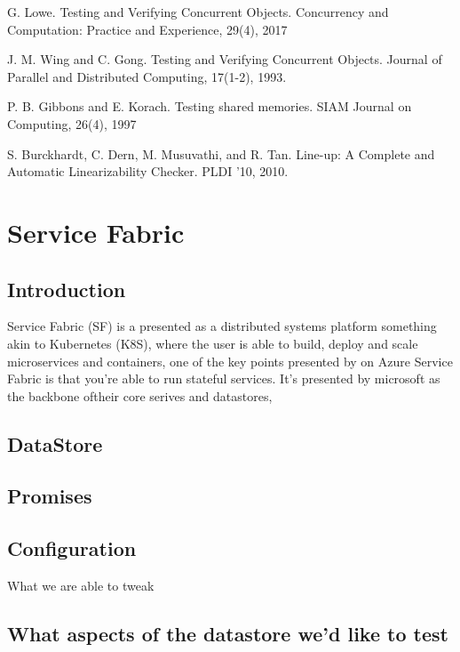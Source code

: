 \documentclass[
  a4paper,  %
  twoside,  %
  bibliography=totoc,
  headsepline,
  cleardoublepage=empty,
  parskip=half,
  draft=false
]{scrbook}
\begin{document}
G. Lowe. Testing and Verifying Concurrent Objects.
Concurrency and Computation: Practice and
Experience, 29(4), 2017

J. M. Wing and C. Gong. Testing and Verifying
Concurrent Objects. Journal of Parallel and
Distributed Computing, 17(1-2), 1993.

P. B. Gibbons and E. Korach. Testing shared
memories. SIAM Journal on Computing, 26(4), 1997

S. Burckhardt, C. Dern, M. Musuvathi, and R. Tan.
Line-up: A Complete and Automatic Linearizability
Checker. PLDI ’10, 2010.


\section{Service Fabric}

\subsection{Introduction}

Service Fabric (SF) is a presented as a distributed systems platform something akin to Kubernetes (K8S), where the user is able to build, deploy and scale microservices and containers, one of the key points presented by on Azure Service Fabric is that you're able to run stateful services. It's presented by microsoft as the backbone oftheir core serives and datastores, 



\subsection{DataStore}




\subsection{Promises}


\subsection{Configuration}


What we are able to tweak


\subsection{What aspects of the datastore we'd like to test}
\end{document}
